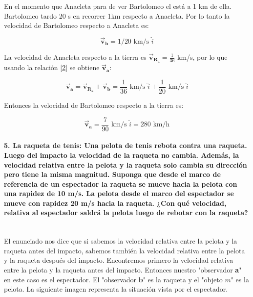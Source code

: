 \documentclass[a4paper,11pt]{article}
\theoremstyle{mytheor}
\begin{document}
En el momento que Anacleta para de ver Bartolomeo el está a 1 km de ella. Bartolomeo tardo 20 s en recorrer 1km respecto a Anacleta. Por lo tanto la velocidad de Bartolomeo respecto a Anacleta es:

 $$ \vec{\textbf{v}}_{\textbf{b}} = 1/20 \text{ km/s } \hat{i}$$ 


La velocidad de Anacleta respecto a la tierra es $  \vec{\textbf{v}}_{\textbf{R}_\textbf{a}}=\frac{1}{36}$ km/s, por lo que usando la relación \ref{2} se obtiene $ \vec{\textbf{v}}_{\textbf{a}}$:

\begin{equation}
\vec{\textbf{v}}_{\textbf{a}} = \vec{\textbf{v}}_{\textbf{R}_\textbf{a}} + \vec{\textbf{v}}_{\textbf{b}} =  \frac{1}{36}\text{ km/s }\hat{i} + \frac{1}{20} \text{ km/s } \hat{i}
\end{equation}

Entonces la velocidad de Bartolomeo respecto a la tierra es:


\begin{equation}
\vec{\textbf{v}}_{\textbf{a}} = \frac{7}{90} \text{ km/s } \hat{i} = 280 \text{ km/h}
\end{equation}


\paragraph{5. La raqueta de tenis: Una pelota de tenis rebota contra una raqueta. Luego del impacto la velocidad de la raqueta no cambia. Además, la velocidad relativa entre la pelota y la raqueta solo cambia su dirección pero tiene la misma magnitud. Suponga que desde el marco de referencia de un espectador la raqueta se mueve hacia la pelota con una rapidez de 10 m/s. La pelota desde el marco del espectador se mueve con rapidez 20 m/s hacia la raqueta. ¿Con qué velocidad, relativa al espectador saldrá la pelota luego de rebotar con la raqueta?\\
	\\ } 


El enunciado nos dice que si sabemos la velocidad relativa entre la pelota y la raqueta antes del impacto, sabemos también la velocidad relativa entre la pelota y la raqueta después del impacto. Encontremos primero la velocidad relativa entre la pelota y la raqueta antes del impacto. Entonces nuestro "observador \textbf{a}"  en este caso es el espectador. El  "observador \textbf{b}" es la raqueta y el "objeto $m$" es la pelota. La siguiente imagen representa la situación vista por el espectador.
\end{document}
